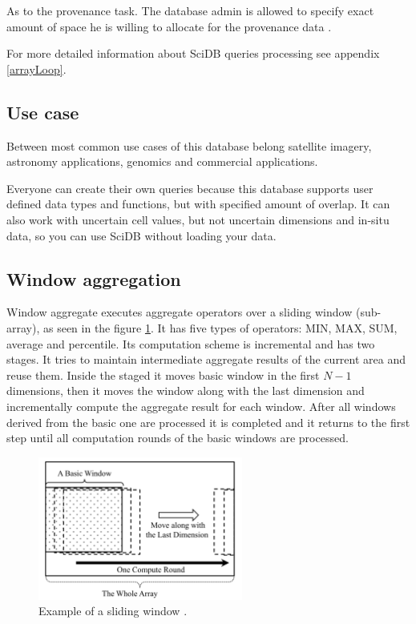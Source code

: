 As to the provenance task. The database admin is allowed to specify exact amount of space he is willing to allocate for the provenance data \cite{scidbarch}.

For more detailed information about SciDB queries processing see appendix \ref{arrayLoop}.

\subsection{Use case}

Between most common use cases of this database belong satellite imagery, astronomy applications, genomics and commercial applications.

Everyone can create their own queries because this database supports user defined data types and functions, but with specified amount of overlap. It can also work with uncertain cell values, but not uncertain dimensions and in-situ data, so you can use SciDB without loading your data.


\subsection{Window aggregation}
Window aggregate executes aggregate operators over a sliding window (sub-array), as seen in the figure \ref{windowAMwin}. It has five types of operators: MIN, MAX, SUM, average and percentile.
Its computation scheme is incremental and has two stages. It tries to maintain intermediate aggregate results of the current area and reuse them. Inside the staged it moves basic window in the first $N-1$ dimensions, then it moves the window along with the last dimension and incrementally compute the aggregate result for each window. After all windows derived from the basic one are processed it is completed and it returns to the first step until all computation rounds of the basic windows are processed.

\begin{figure}
\centering
\includegraphics[width=0.6\textwidth]{windowAM.PNG}
\caption{Example of a sliding window \cite{windowAggr}. }
\label{windowAMwin}
\end{figure}

